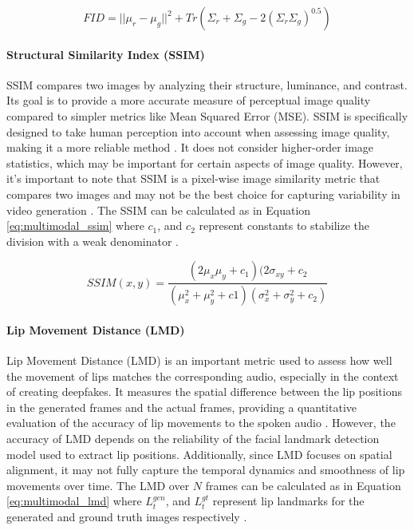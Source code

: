 \begin{equation}
    FID = ||\mu_r - \mu_g||^2 + Tr(\Sigma_r+\Sigma_g - 2(\Sigma_r\Sigma_g)^{0.5})
    \label{eq:multimodal_fid}
\end{equation}

\paragraph{Structural Similarity Index (SSIM)}

SSIM compares two images by analyzing their structure, luminance, and contrast. Its goal is to provide a more accurate measure of perceptual image quality compared to simpler metrics like Mean Squared Error (MSE). SSIM is specifically designed to take human perception into account when assessing image quality, making it a more reliable method \cite{sun2020landmark, dagar2022literature, husseini2023comprehensive}. It does not consider higher-order image statistics, which may be important for certain aspects of image quality. However, it's important to note that SSIM is a pixel-wise image similarity metric that compares two images and may not be the best choice for capturing variability in video generation \cite{shrivastava2021diverse}. The SSIM can be calculated as in Equation \ref{eq:multimodal_ssim} where $c_1$, and $c_2$ represent constants to stabilize the division with a weak denominator \cite{wang2004image}.

\begin{equation}
    SSIM(x,y) = \frac{(2\mu_x \mu_y + c_1)(2\sigma_{xy}+c_2}{(\mu_x^2+\mu_y^2+c1)(\sigma_x^2+\sigma_y^2+c_2)}
    \label{eq:multimodal_ssim}
\end{equation}

\paragraph{Lip Movement Distance (LMD)}

Lip Movement Distance (LMD) is an important metric used to assess how well the movement of lips matches the corresponding audio, especially in the context of creating deepfakes. It measures the spatial difference between the lip positions in the generated frames and the actual frames, providing a quantitative evaluation of the accuracy of lip movements to the spoken audio \cite{chen2018lip}. However, the accuracy of LMD depends on the reliability of the facial landmark detection model used to extract lip positions. Additionally, since LMD focuses on spatial alignment, it may not fully capture the temporal dynamics and smoothness of lip movements over time. The LMD over $N$ frames can be calculated as in Equation \ref{eq:multimodal_lmd} where $L_t^{gen}$, and $L_t^{gt}$ represent lip landmarks for the generated and ground truth images respectively \cite{chen2018lip}.


